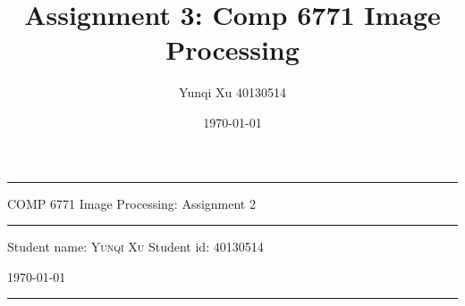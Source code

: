 \documentclass[12pt]{article}
\title{Assignment 3: Comp 6771 Image Processing}
\author{Yunqi Xu 40130514}
\date{\today}
\begin{document}

\begin{titlepage}
  \rule{\textwidth}{1pt}   %
    \vspace{0.2\textheight}  %


    {\Huge COMP 6771 Image Processing: Assignment 2}

    \vspace{0.025\textheight}   %

    \rule{0.83\textwidth}{0.4pt}  %

    \vspace{0.1\textheight}  %


    {\Large Student name: \textsc{Yunqi Xu}}
    \vfill
    {\Large Student id: 40130514}
    \vfill  %

    {\large \today}
    \vspace{0.1\textheight}  %


    \rule{\textwidth}{1pt}  %
\end{titlepage}
\end{document}
